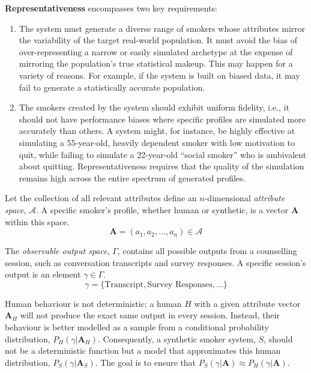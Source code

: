 \textbf{Representativeness} encompasses two key requirements:

\begin{enumerate}
    \item The system must generate a diverse range of smokers whose attributes mirror the variability of the target real-world population. It must avoid the bias of over-representing a narrow or easily simulated archetype at the expense of mirroring the population's true statistical makeup. This may happen for a variety of reasons. For example, if the system is built on biased data, it may fail to generate a statistically accurate population.

    \item The smokers created by the system should exhibit uniform fidelity, i.e., it should not have performance biases where specific profiles are simulated more accurately than others. A system might, for instance, be highly effective at simulating a 55-year-old, heavily dependent smoker with low motivation to quit, while failing to simulate a 22-year-old ``social smoker'' who is ambivalent about quitting. Representativeness requires that the quality of the simulation remains high across the entire spectrum of generated profiles.
\end{enumerate}



Let the collection of all relevant attributes define an $n$-dimensional \emph{attribute space}, $\mathcal{A}$. A specific smoker's profile, whether human or synthetic, is a vector $\textbf{A}$ within this space.
$$\textbf{A} = (a_1, a_2, \ldots, a_n) \in \mathcal{A}$$

The \emph{observable output space}, $\Gamma$, contains all possible outputs from a counselling session, such as conversation transcripts and survey responses. A specific session's output is an element $\gamma \in \Gamma$.
$$\gamma = \{\text{Transcript}, \text{Survey Responses}, \ldots\}$$

Human behaviour is not deterministic; a human $H$ with a given attribute vector $\textbf{A}_H$ will not produce the exact same output in every session. Instead, their behaviour is better modelled as a sample from a conditional probability distribution, $P_H(\gamma | \textbf{A}_H)$. Consequently, a synthetic smoker system, $S$, should not be a deterministic function but a model that approximates this human distribution, $P_S(\gamma | \textbf{A}_S)$. The goal is to ensure that $P_S(\gamma | \textbf{A}) \approx P_H(\gamma | \textbf{A})$.

